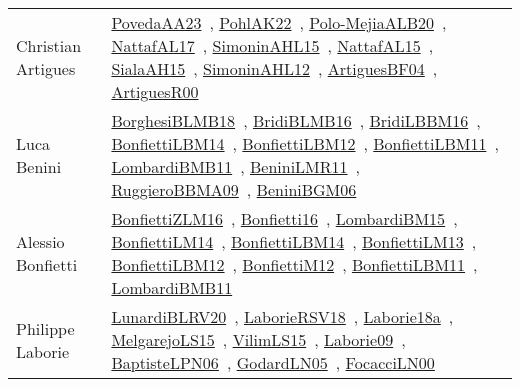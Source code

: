 {\begin{longtable}{p{4cm}p{20cm}}
Christian Artigues & \href{papers/PovedaAA23.pdf}{PovedaAA23}~\cite{PovedaAA23}, \href{articles/PohlAK22.pdf}{PohlAK22}~\cite{PohlAK22}, \href{}{Polo-MejiaALB20}~\cite{Polo-MejiaALB20}, \href{articles/NattafAL17.pdf}{NattafAL17}~\cite{NattafAL17}, \href{articles/SimoninAHL15.pdf}{SimoninAHL15}~\cite{SimoninAHL15}, \href{articles/NattafAL15.pdf}{NattafAL15}~\cite{NattafAL15}, \href{papers/SialaAH15.pdf}{SialaAH15}~\cite{SialaAH15}, \href{papers/SimoninAHL12.pdf}{SimoninAHL12}~\cite{SimoninAHL12}, \href{papers/ArtiguesBF04.pdf}{ArtiguesBF04}~\cite{ArtiguesBF04}, \href{articles/ArtiguesR00.pdf}{ArtiguesR00}~\cite{ArtiguesR00}\\
Luca Benini & \href{articles/BorghesiBLMB18.pdf}{BorghesiBLMB18}~\cite{BorghesiBLMB18}, \href{articles/BridiBLMB16.pdf}{BridiBLMB16}~\cite{BridiBLMB16}, \href{papers/BridiLBBM16.pdf}{BridiLBBM16}~\cite{BridiLBBM16}, \href{articles/BonfiettiLBM14.pdf}{BonfiettiLBM14}~\cite{BonfiettiLBM14}, \href{papers/BonfiettiLBM12.pdf}{BonfiettiLBM12}~\cite{BonfiettiLBM12}, \href{papers/BonfiettiLBM11.pdf}{BonfiettiLBM11}~\cite{BonfiettiLBM11}, \href{papers/LombardiBMB11.pdf}{LombardiBMB11}~\cite{LombardiBMB11}, \href{articles/BeniniLMR11.pdf}{BeniniLMR11}~\cite{BeniniLMR11}, \href{articles/RuggieroBBMA09.pdf}{RuggieroBBMA09}~\cite{RuggieroBBMA09}, \href{papers/BeniniBGM06.pdf}{BeniniBGM06}~\cite{BeniniBGM06}\\
Alessio Bonfietti & \href{papers/BonfiettiZLM16.pdf}{BonfiettiZLM16}~\cite{BonfiettiZLM16}, \href{}{Bonfietti16}~\cite{Bonfietti16}, \href{papers/LombardiBM15.pdf}{LombardiBM15}~\cite{LombardiBM15}, \href{papers/BonfiettiLM14.pdf}{BonfiettiLM14}~\cite{BonfiettiLM14}, \href{articles/BonfiettiLBM14.pdf}{BonfiettiLBM14}~\cite{BonfiettiLBM14}, \href{papers/BonfiettiLM13.pdf}{BonfiettiLM13}~\cite{BonfiettiLM13}, \href{papers/BonfiettiLBM12.pdf}{BonfiettiLBM12}~\cite{BonfiettiLBM12}, \href{papers/BonfiettiM12.pdf}{BonfiettiM12}~\cite{BonfiettiM12}, \href{papers/BonfiettiLBM11.pdf}{BonfiettiLBM11}~\cite{BonfiettiLBM11}, \href{papers/LombardiBMB11.pdf}{LombardiBMB11}~\cite{LombardiBMB11}\\
Philippe Laborie & \href{articles/LunardiBLRV20.pdf}{LunardiBLRV20}~\cite{LunardiBLRV20}, \href{articles/LaborieRSV18.pdf}{LaborieRSV18}~\cite{LaborieRSV18}, \href{papers/Laborie18a.pdf}{Laborie18a}~\cite{Laborie18a}, \href{papers/MelgarejoLS15.pdf}{MelgarejoLS15}~\cite{MelgarejoLS15}, \href{papers/VilimLS15.pdf}{VilimLS15}~\cite{VilimLS15}, \href{papers/Laborie09.pdf}{Laborie09}~\cite{Laborie09}, \href{}{BaptisteLPN06}~\cite{BaptisteLPN06}, \href{}{GodardLN05}~\cite{GodardLN05}, \href{papers/FocacciLN00.pdf}{FocacciLN00}~\cite{FocacciLN00}\\

\end{longtable}}
